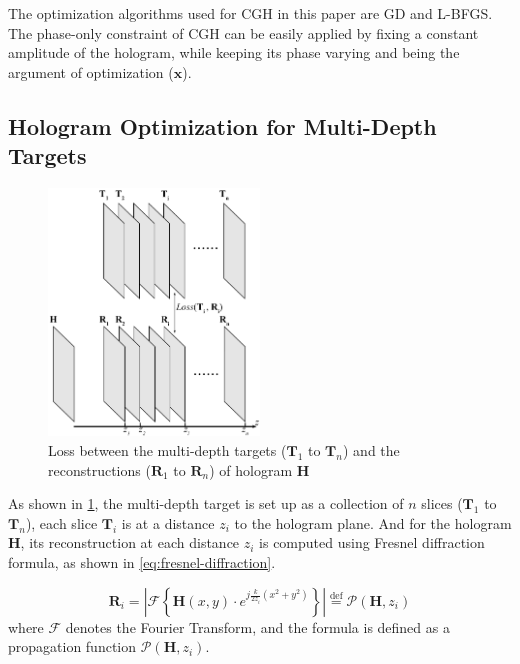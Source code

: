 The optimization algorithms used for CGH in this paper are GD and L-BFGS. The phase-only constraint of CGH can be easily applied by fixing a constant amplitude of the hologram, while keeping its phase varying and being the argument of optimization ($\textbf{x}$).




\subsection{Hologram Optimization for Multi-Depth Targets}

\begin{figure}[h!]
	\centering
	\includegraphics[width=0.5\textwidth]{Fresnel_slice_illustration}
	\caption{Loss between the multi-depth targets ($\textbf{T}_1$ to $\textbf{T}_n$) and the reconstructions ($\textbf{R}_1$ to $\textbf{R}_n$) of hologram $\textbf{H}$}
	\label{fig:Fresnel_slice_illustration}
\end{figure}

As shown in \cref{fig:Fresnel_slice_illustration}, the multi-depth target is set up as a collection of $n$ slices ($\textbf{T}_1$ to $\textbf{T}_n$), each slice $\textbf{T}_i$ is at a distance $z_i$ to the hologram plane. And for the hologram $\textbf{H}$, its reconstruction at each distance $z_i$ is computed using Fresnel diffraction formula, as shown in \cref{eq:fresnel-diffraction}.

\begin{equation}
	\textbf{R}_i = \left\lvert \mathcal{F} \left\{\textbf{H}(x,y) \cdot e^{j\frac{k}{2z_i}(x^2+y^2)}\right\} \right\rvert \stackrel{\text{def}}{=} \mathcal{P}(\textbf{H}, z_i)
	\label{eq:fresnel-diffraction}
\end{equation}
where $\mathcal{F}$ denotes the Fourier Transform, and the formula is defined as a propagation function $\mathcal{P}(\textbf{H}, z_i)$.


